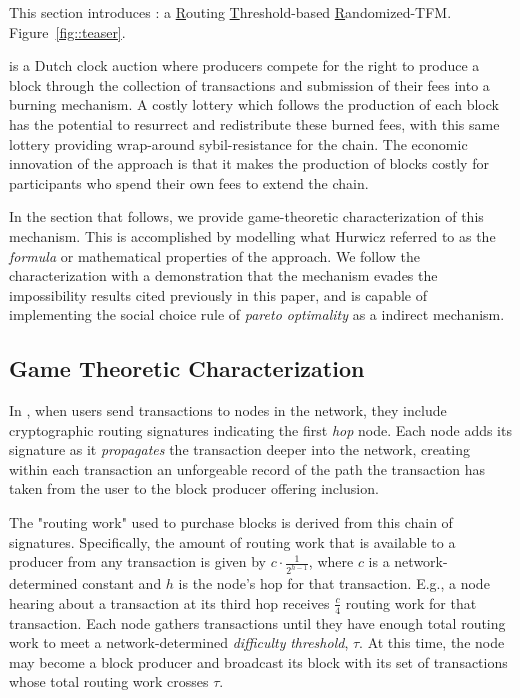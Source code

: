 
This section introduces \ourTFM: a \underline{R}outing \underline{T}hreshold-based \underline{R}andomized-TFM. Figure~\ref{fig::teaser}.

\ourTFM is a Dutch clock auction where producers compete for the right to produce a block through the collection of transactions and submission of their fees into a burning mechanism. A costly lottery which follows the production of each block has the potential to resurrect and redistribute these burned fees, with this same lottery providing wrap-around sybil-resistance for the chain. The economic innovation of the approach is that it makes the production of blocks costly for participants who spend their own fees to extend the chain.

In the section that follows, we provide game-theoretic characterization of this mechanism. This is accomplished by modelling what Hurwicz referred to as the \textit{formula} or mathematical properties of the approach. We follow the characterization with a demonstration that the mechanism evades the impossibility results cited previously in this paper, and is capable of implementing the social choice rule of \textit{pareto optimality} as a indirect mechanism.

\subsection{Game Theoretic Characterization}

In \ourTFM, when users send transactions to nodes in the network, they include cryptographic routing signatures indicating the first \emph{hop} node. Each node adds its signature as it \emph{propagates} the transaction deeper into the network, creating within each transaction an unforgeable record of the path the transaction has taken from the user to the block producer offering inclusion.

The "routing work" used to purchase blocks is derived from this chain of signatures. Specifically, the amount of routing work that is available to a producer from any transaction is given by $c\cdot \frac{1}{2^{h-1}}$, where $c$ is a network-determined constant and $h$ is the node's hop for that transaction. E.g., a node hearing about a transaction at its third hop receives $\frac{c}{4}$ routing work for that transaction. Each node gathers transactions until they have enough total routing work to meet a network-determined \textit{difficulty} \textit{threshold}, $\tau$. At this time, the node may become a block producer and broadcast its block with its set of transactions whose total routing work crosses $\tau$.

